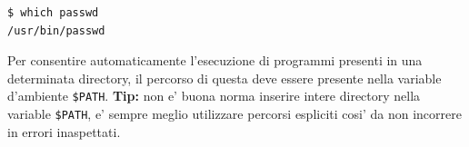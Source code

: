 \begin{lstlisting}[language=bash,basicstyle=\ttfamily,frame=single]
$ which passwd
/usr/bin/passwd
\end{lstlisting}
Per consentire automaticamente l'esecuzione di programmi presenti in una determinata directory, il percorso
di questa deve essere presente nella variable d'ambiente \texttt{\$PATH}.
\textbf{Tip:} non e' buona norma inserire intere directory nella variable \texttt{\$PATH}, e' 
sempre meglio utilizzare
percorsi espliciti cosi' da non incorrere in errori inaspettati.
